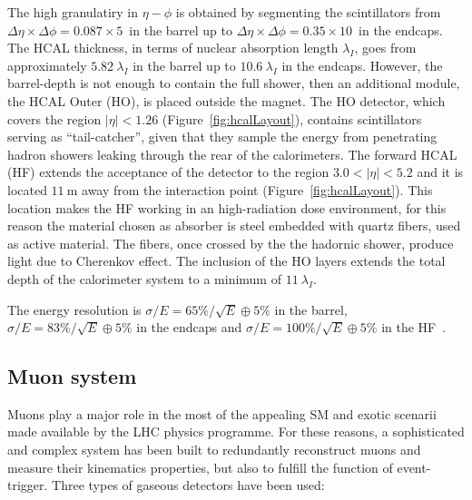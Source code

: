 The high granulatiry in $\eta-\phi$ is obtained by segmenting the scintillators 
from $\Delta\eta\times\Delta\phi=0.087\times5$\textdegree~in the barrel up to 
$\Delta\eta\times\Delta\phi=0.35\times10$\textdegree~in the endcaps.
The HCAL thickness, in terms of nuclear absorption length $\lambda_I$, goes from approximately 
$5.82~\lambda_I$ in the barrel up to $10.6~\lambda_I$ in the endcaps. However, the barrel-depth is not enough to 
contain the full shower, then an additional module, the HCAL Outer (HO), is placed
outside the magnet. The HO detector, which covers the region $|\eta|<1.26$ (Figure~\ref{fig:hcalLayout}), 
contains scintillators serving as ``tail-catcher'', given that they sample the energy from penetrating hadron showers 
leaking through the rear of the calorimeters. The forward HCAL (HF) extends the acceptance of the 
detector to the region $3.0<|\eta|<5.2$ and it is located $11~\si{\m}$ away from the interaction point 
(Figure~\ref{fig:hcalLayout}). This location makes the HF working in an high-radiation dose environment, 
for this reason the material chosen as absorber is steel embedded with quartz fibers, used as active material. 
The fibers, once crossed by the the hadornic shower, produce light due to Cherenkov effect.
The inclusion of the HO layers extends the total depth of the calorimeter system to a minimum of $11~\lambda_I$.

The energy resolution is $\sigma/E=65\%/\sqrt{E}\oplus5\%$ in the barrel, $\sigma/E=83\%/\sqrt{E}\oplus5\%$
in the endcaps and $\sigma/E=100\%/\sqrt{E}\oplus5\%$ in the HF~\cite{hcalTDR}.

\subsection{Muon system}
\label{subsec:muonsys}

Muons play a major role in the most of the appealing SM and exotic scenarii made available by the 
LHC physics programme. For these reasons, a sophisticated and complex system has been built
to redundantly reconstruct muons and measure their kinematics properties, but also to fulfill the function of event-trigger.
Three types of gaseous detectors have been used:







